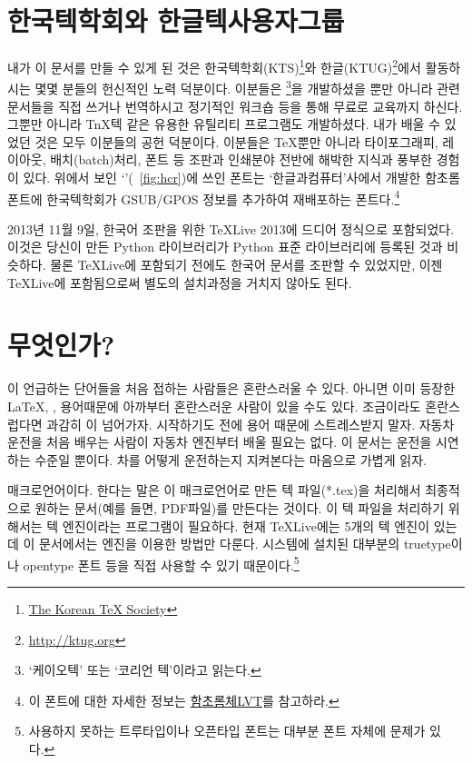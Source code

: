 \documentclass[oneside, chapter, 11pt]{oblivoir}
\begin{document}
\section{한국텍학회와 한글텍사용자그룹}\label{sec:ktug}
내가 이 문서를 만들 수 있게 된 것은 한국텍학회(KTS)\footnote{\href{http://www.ktug.org/xe/?mid=KTS}{The Korean TeX Society}}와 한글(KTUG)\footnote{\href{http://ktug.org}{http://ktug.org}}에서 활동하시는 몇몇 분들의 헌신적인 노력 덕분이다. 이분들은 \koTeX\footnote{`케이오텍' 또는 `코리언 텍'이라고 읽는다.}을 개발하셨을 뿐만 아니라 관련 문서들을 직접 쓰거나 번역하시고 정기적인 워크숍 등을 통해 무료로 교육까지 하신다. 그뿐만 아니라 TnX텍 같은 유용한 유틸리티 프로그램도 개발하셨다. 내가  배울 수 있었던 것은 모두 이분들의 공헌 덕분이다. 이분들은 \TeX 뿐만 아니라 타이포그래피, 레이아웃, 배치(batch)처리, 폰트 등 조판과 인쇄분야 전반에 해박한 지식과 풍부한 경험이 있다. 위에서 보인 `'(\figurename~\ref{fig:hcr})에 쓰인 폰트는 `한글과컴퓨터'사에서 개발한 함초롬폰트에 한국텍학회가 GSUB/GPOS 정보를 추가하여 재배포하는 폰트\label{hcr}다.\footnote{이 폰트에 대한 자세한 정보는 \href{http://wiki.ktug.org/wiki/wiki.php/\%ED\%95\%A8\%EC\%B4\%88\%EB\%A1\%AC\%EC\%B2\%B4LVT}{함초롬체LVT}를 참고하라.}

2013년 11월 9일, 한국어 조판을 위한  TeXLive 2013에 드디어 정식으로 포함되었다. 이것은 당신이 만든 Python 라이브러리가 Python 표준 라이브러리에 등록된 것과 비슷하다. 물론 TeXLive에 포함되기 전에도  한국어 문서를 조판할 수 있었지만, 이젠 TeXLive에 포함됨으로써 별도의 설치과정을 거치지 않아도 된다.

\section{ 무엇인가?}
이  언급하는 단어들을 처음 접하는 사람들은 혼란스러울 수 있다. 아니면 이미 등장한 \LaTeX, \koTeX,  용어때문에 아까부터 혼란스러운 사람이 있을 수도 있다. 조금이라도 혼란스럽다면 과감히 이  넘어가자. 시작하기도 전에 용어 때문에 스트레스받지 말자. 자동차 운전을 처음 배우는 사람이 자동차 엔진부터 배울 필요는 없다. 이 문서는 운전을 시연하는 수준일 뿐이다.  차를 어떻게 운전하는지 지켜본다는 마음으로 가볍게 읽자.

 매크로언어이다.  한다는 말은 이 매크로언어로 만든 텍 파일(*.tex)을 처리해서 최종적으로 원하는 문서(예를 들면, PDF파일)를 만든다는 것이다. 이 텍 파일을 처리하기 위해서는 텍 엔진이라는 프로그램이 필요하다. 현재 TeXLive에는 5개의 텍 엔진이 있는데 이 문서에서는  엔진을 이용한 방법만 다룬다.  시스템에 설치된 대부분의 truetype이나 opentype 폰트 등을 직접 사용할 수 있기 때문이다.\footnote{ 사용하지 못하는 트루타입이나 오픈타입 폰트는 대부분 폰트 자체에 문제가 있다.}
\end{document}
